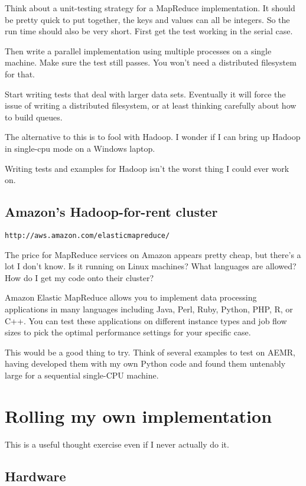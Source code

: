\documentclass[11pt]{article}
\begin{document}
Think about a unit-testing strategy for a MapReduce implementation. It
should be pretty quick to put together, the keys and values can all be
integers. So the run time should also be very short. First get the
test working in the serial case.

Then write a parallel implementation using multiple processes on a
single machine. Make sure the test still passes. You won't need a
distributed filesystem for that.

Start writing tests that deal with larger data sets. Eventually it
will force the issue of writing a distributed filesystem, or at least
thinking carefully about how to build queues.

The alternative to this is to fool with Hadoop. I wonder if I can
bring up Hadoop in single-cpu mode on a Windows laptop.

Writing tests and examples for Hadoop isn't the worst thing I could
ever work on.

\subsection{Amazon's Hadoop-for-rent cluster}

{\tt http://aws.amazon.com/elasticmapreduce/}
 
The price for MapReduce services on Amazon appears pretty cheap, but
there's a lot I don't know. Is it running on Linux machines? What
languages are allowed? How do I get my code onto their cluster?

Amazon Elastic MapReduce allows you to implement data processing
applications in many languages including Java, Perl, Ruby, Python,
PHP, R, or C++. You can test these applications on different instance
types and job flow sizes to pick the optimal performance settings for
your specific case.

This would be a good thing to try. Think of several examples to test
on AEMR, having developed them with my own Python code and found them
untenably large for a sequential single-CPU machine.

\section{Rolling my own implementation}

This is a useful thought exercise even if I never actually do it.

\subsection{Hardware}
\end{document}
